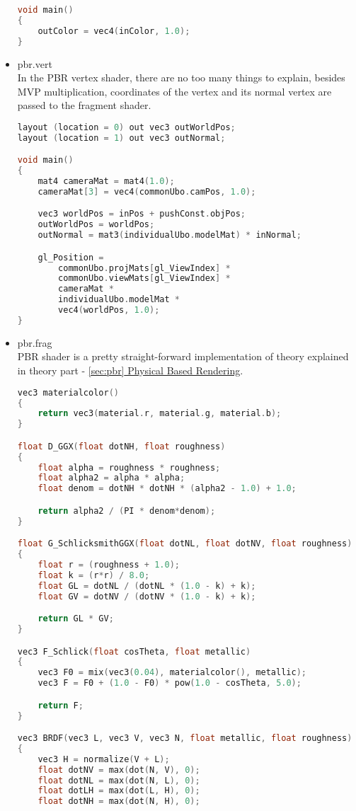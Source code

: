\begin{itemize}
\begin{lstlisting}[language=c++, caption=Normal lighting fragment shader(./assets/shaders/normal\_lighting.frag)]
void main()
{
    outColor = vec4(inColor, 1.0);
}
\end{lstlisting}
    \item pbr.vert\\
    In the PBR vertex shader, there are no too many things to explain, besides MVP multiplication, coordinates of the vertex and its normal vertex are passed to the fragment shader. 
\begin{lstlisting}[language=c++, caption=PBR vertex shader(./assets/shaders/pbr.vert)]
layout (location = 0) out vec3 outWorldPos;
layout (location = 1) out vec3 outNormal;

void main()
{
    mat4 cameraMat = mat4(1.0);
    cameraMat[3] = vec4(commonUbo.camPos, 1.0);

    vec3 worldPos = inPos + pushConst.objPos;
    outWorldPos = worldPos;
    outNormal = mat3(individualUbo.modelMat) * inNormal;

    gl_Position =
        commonUbo.projMats[gl_ViewIndex] *
        commonUbo.viewMats[gl_ViewIndex] *
        cameraMat *
        individualUbo.modelMat *
        vec4(worldPos, 1.0);
}
\end{lstlisting}
    \item pbr.frag\\
    PBR shader is a pretty straight-forward implementation of theory explained in theory part - \hyperref[sec:pbr]{\ref*{sec:pbr} Physical Based Rendering}.
\begin{lstlisting}[language=c++, caption=PBR fragment shader(./assets/shaders/pbr.frag)]
vec3 materialcolor()
{
    return vec3(material.r, material.g, material.b);
}

float D_GGX(float dotNH, float roughness)
{
    float alpha = roughness * roughness;
    float alpha2 = alpha * alpha;
    float denom = dotNH * dotNH * (alpha2 - 1.0) + 1.0;

    return alpha2 / (PI * denom*denom);
}

float G_SchlicksmithGGX(float dotNL, float dotNV, float roughness)
{
    float r = (roughness + 1.0);
    float k = (r*r) / 8.0;
    float GL = dotNL / (dotNL * (1.0 - k) + k);
    float GV = dotNV / (dotNV * (1.0 - k) + k);

    return GL * GV;
}

vec3 F_Schlick(float cosTheta, float metallic)
{
    vec3 F0 = mix(vec3(0.04), materialcolor(), metallic);
    vec3 F = F0 + (1.0 - F0) * pow(1.0 - cosTheta, 5.0);

    return F;
}

vec3 BRDF(vec3 L, vec3 V, vec3 N, float metallic, float roughness)
{
    vec3 H = normalize(V + L);
    float dotNV = max(dot(N, V), 0);
    float dotNL = max(dot(N, L), 0);
    float dotLH = max(dot(L, H), 0);
    float dotNH = max(dot(N, H), 0);


\end{lstlisting}
\end{itemize}
